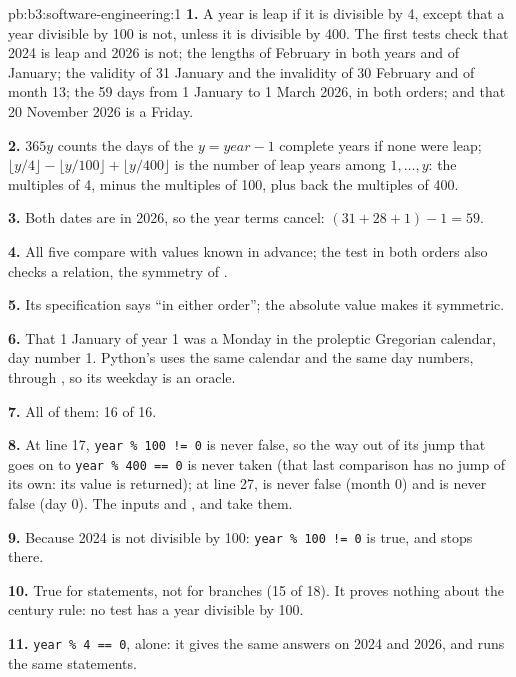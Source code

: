 \begin{solution}{pb:b3:software-engineering:1}
\textbf{1.} A year is leap if it is divisible by 4, except that a year divisible by 100 is not, unless it is divisible by 400. The first tests check that 2024 is leap and 2026 is not; the lengths of February in both years and of January; the validity of 31 January and the invalidity of 30 February and of month 13; the 59 days from 1 January to 1 March 2026, in both orders; and that 20 November 2026 is a Friday.

\textbf{2.} $365y$ counts the days of the $y = \mathit{year} - 1$ complete years if none were leap; $\lfloor y/4\rfloor - \lfloor y/100\rfloor + \lfloor y/400\rfloor$ is the number of leap years among $1, \dots, y$: the multiples of 4, minus the multiples of 100, plus back the multiples of 400.

\textbf{3.} Both dates are in 2026, so the year terms cancel: $(31 + 28 + 1) - 1 = 59$.

\textbf{4.} All five compare with values known in advance; the test in both orders also checks a relation, the symmetry of .

\textbf{5.} Its specification says ``in either order''; the absolute value makes it symmetric.

\textbf{6.} That 1 January of year 1 was a Monday in the proleptic Gregorian calendar, day number 1. Python's  uses the same calendar and the same day numbers, through , so its weekday is an oracle.

\textbf{7.} All of them: 16 of 16.

\textbf{8.} At line 17, \texttt{year \% 100 != 0} is never false, so the way out of its jump that goes on to \texttt{year \% 400 == 0} is never taken (that last comparison has no jump of its own: its value is returned); at line 27,  is never false (month 0) and  is never false (day 0). The inputs  and ,  and  take them.

\textbf{9.} Because 2024 is not divisible by 100: \texttt{year \% 100 != 0} is true, and  stops there.

\textbf{10.} True for statements, not for branches (15 of 18). It proves nothing about the century rule: no test has a year divisible by 100.

\textbf{11.} \texttt{year \% 4 == 0}, alone: it gives the same answers on 2024 and 2026, and runs the same statements.


\end{solution}
